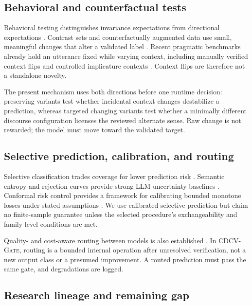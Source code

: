 \documentclass[preprint,12pt,authoryear]{elsarticle}
\newcommand{\cdcv}{\textsc{CDCV-Gate}}
\begin{document}
\subsection{Behavioral and counterfactual tests}

Behavioral testing distinguishes invariance expectations from directional
expectations \citep{ribeiro-etal-2020-beyond}. Contrast sets and
counterfactually augmented data use small, meaningful changes that alter a
validated label \citep{gardner-etal-2020-evaluating,
kaushik2020counterfactual}. Recent pragmatic benchmarks already hold an
utterance fixed while varying context, including manually verified context
flips and controlled implicature contexts
\citep{li-etal-2026-born,arai-ren-2026-drinq}. Context flips are therefore not
a standalone novelty.

The present mechanism uses both directions before one runtime decision:
preserving variants test whether incidental context changes destabilize a
prediction, whereas targeted changing variants test whether a minimally
different discourse configuration licenses the reviewed alternate sense. Raw
change is not rewarded; the model must move toward the validated target.

\subsection{Selective prediction, calibration, and routing}

Selective classification trades coverage for lower prediction risk
\citep{geifman2019selectivenet}. Semantic entropy and rejection curves provide
strong LLM uncertainty baselines \citep{farquhar2024semantic}. Conformal risk
control provides a framework for calibrating bounded monotone losses under
stated assumptions \citep{angelopoulos2024conformal}. We use calibrated
selective prediction but claim no finite-sample guarantee unless the selected
procedure's exchangeability and family-level conditions are met.

Quality- and cost-aware routing between models is also established
\citep{ding2024hybrid,ong2025routellm}. In \cdcv, routing is a bounded internal
operation after unresolved verification, not a new output class or a presumed
improvement. A routed prediction must pass the same gate, and degradations are
logged.

\subsection{Research lineage and remaining gap}
\end{document}
